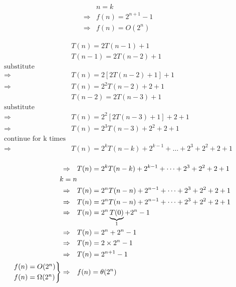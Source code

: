 \documentclass[12pt]{article}
\begin{document}
\begin{align*}
&n = k \\
\Rightarrow &f(n) = 2^{n+1} - 1 \\
\Rightarrow &f(n) = O(2^{n})
\end{align*}







\begin{align*}
&T(n) = 2 T(n-1) + 1 \\
&T(n-1) = 2 T(n-2) + 1 \\
\text{substitute}& \\
\Rightarrow \quad &T(n) = 2 [ 2T(n-2) + 1 ] + 1 \\
\Rightarrow \quad &T(n) =  2^{2} T(n-2) + 2 + 1\\
&T(n-2) = 2T(n-3) + 1 \\
\text{substitute} \\
\Rightarrow \quad &T(n) = 2^{2}[ 2T(n-3) + 1 ] + 2 + 1 \\
\Rightarrow \quad &T(n) =  2^{3}T(n-3) + 2^{2} + 2 +1 \\
\text{continue for k times}& \\
\Rightarrow \quad &T(n) =  2^{k}T(n-k) + 2^{k-1} + \dots + 2^{3} + 2^{2} + 2 + 1 \\
\end{align*}







\begin{align*}
\Rightarrow \quad &T(n) = 2^{k}T(n-k) + 2^{k-1} + \dots + 2^{3} + 2^{2} + 2 + 1 \\
k = n \\
\Rightarrow \quad &T(n) = 2^{n}T(n-n) + 2^{n-1} + \dots + 2^{3} + 2^{2} + 2 + 1 \\
\Rightarrow \quad &T(n) = 2^{n}T(n-n) + 2^{n-1} + \dots + 2^{3} + 2^{2} + 2 + 1 \\
\Rightarrow \quad &T(n) = 2^{n}\underbrace{T(0)}_{1} + 2^{n} - 1 \\
\Rightarrow \quad &T(n) = 2^{n}+ 2^{n} - 1 \\
\Rightarrow \quad &T(n) = 2 \times  2^{n} - 1 \\
\Rightarrow \quad &T(n) = 2^{n+1} - 1 \\
\begin{rcases}
&f(n) = O(2^{n}) \\
&f(n) = \Omega(2^{n}) 
\end{rcases}
\Rightarrow \quad &f(n) = \theta(2^{n}) 
\end{align*}
\end{document}

